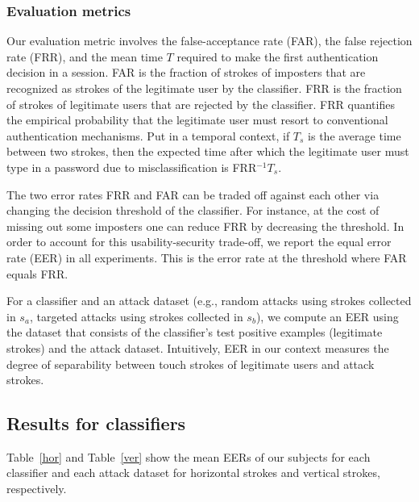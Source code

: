 \documentclass{sig-alternate-05-2015}
\begin{document}
\subsubsection{Evaluation metrics}
Our evaluation metric involves the false-acceptance rate (FAR), the false
rejection rate (FRR), and the mean time $T$ required to make the first
authentication decision in a session. FAR is the fraction of strokes of
imposters that are recognized as strokes of the legitimate user by the classifier.
FRR is the fraction of strokes of legitimate users that are rejected by the
classifier. FRR quantifies the empirical probability that the legitimate user must
resort to conventional authentication mechanisms. Put in a temporal context, if
$T_s$ is the average time between two strokes, then the expected time after
which the legitimate user must type in a password due to misclassification is
FRR$^{-1}T_s$.




 


The two error rates FRR and FAR can be traded off against each other via 
changing the decision threshold of the classifier. For instance, at the
cost of missing out some imposters one can reduce FRR by decreasing the threshold.
In order to account for this
usability-security trade-off, we report the equal error rate (EER) in all
experiments. This is the error rate at the threshold where
FAR equals FRR.

For a classifier and an attack dataset (e.g., random attacks using strokes
collected in $s_a$,  targeted attacks using strokes collected in $s_b$), we compute an EER using the dataset that consists of the
classifier's test positive examples (legitimate  strokes) and the attack
dataset. Intuitively, EER in our context measures the degree of separability
between  touch strokes of legitimate users and attack strokes. 












\subsection{Results for classifiers}

Table~\ref{hor} and Table~\ref{ver} show the mean EERs of our subjects for each classifier and
each attack dataset for horizontal strokes and vertical strokes, respectively.
\end{document}
